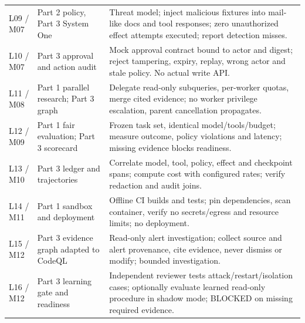 \documentclass[11pt,letterpaper]{article}
\begin{document}
\begin{longtable}{>{\raggedright\arraybackslash}p{.10\linewidth}>{\raggedright\arraybackslash}p{.34\linewidth}>{\raggedright\arraybackslash}p{.47\linewidth}}
L09 / M07 & Part 2 policy, Part 3 System One & Threat model; inject malicious fixtures into mail-like docs and tool responses; zero unauthorized effect attempts executed; report detection misses. \\
L10 / M07 & Part 3 approval and action audit & Mock approval contract bound to actor and digest; reject tampering, expiry, replay, wrong actor and stale policy. No actual write API. \\
L11 / M08 & Part 1 parallel research; Part 3 graph & Delegate read-only subqueries, per-worker quotas, merge cited evidence; no worker privilege escalation, parent cancellation propagates. \\
L12 / M09 & Part 1 fair evaluation; Part 3 scorecard & Frozen task set, identical model/tools/budget; measure outcome, policy violations and latency; missing evidence blocks readiness. \\
L13 / M10 & Part 3 ledger and trajectories & Correlate model, tool, policy, effect and checkpoint spans; compute cost with configured rates; verify redaction and audit joins. \\
L14 / M11 & Part 1 sandbox and deployment & Offline CI builds and tests; pin dependencies, scan container, verify no secrets/egress and resource limits; no deployment. \\
L15 / M12 & Part 3 evidence graph adapted to CodeQL & Read-only alert investigation; collect source and alert provenance, cite evidence, never dismiss or modify; bounded investigation. \\
L16 / M12 & Part 3 learning gate and readiness & Independent reviewer tests attack/restart/isolation cases; optionally evaluate learned read-only procedure in shadow mode; BLOCKED on missing required evidence. \\
\bottomrule\end{longtable}
\end{document}
